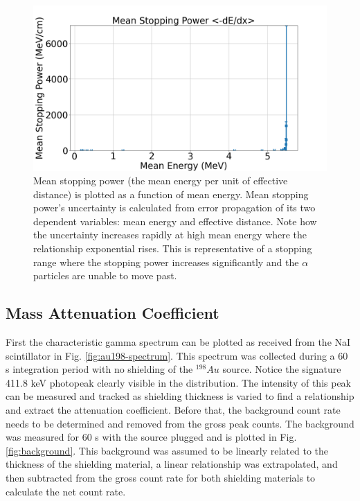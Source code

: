 \begin{figure}
\centering
\includegraphics[width=\textwidth]{stopping_power.png}
\caption{Mean stopping power (the mean energy per unit of effective distance) is plotted as a function of mean energy. Mean stopping power’s uncertainty is calculated from error propagation of its two dependent variables: mean energy and effective distance. Note how the uncertainty increases rapidly at high mean energy where the relationship exponential rises. This is representative of a stopping range where the stopping power increases significantly and the $\alpha$ particles are unable to move past.}
\label{fig:stopping-power}
\end{figure}

\subsection{Mass Attenuation Coefficient}

First the characteristic gamma spectrum can be plotted as received from the NaI scintillator in Fig. \ref{fig:au198-spectrum}. This spectrum was collected during a 60 s integration period with no shielding of the ${}^{198}Au$ source. Notice the signature 411.8 keV photopeak clearly visible in the distribution. The intensity of this peak can be measured and tracked as shielding thickness is varied to find a relationship and extract the attenuation coefficient. Before that, the background count rate needs to be determined and removed from the gross peak counts. The background was measured for 60 s with the source plugged and is plotted in Fig. \ref{fig:background}. This background was assumed to be linearly related to the thickness of the shielding material, a linear relationship was extrapolated, and then subtracted from the gross count rate for both shielding materials to calculate the net count rate.

